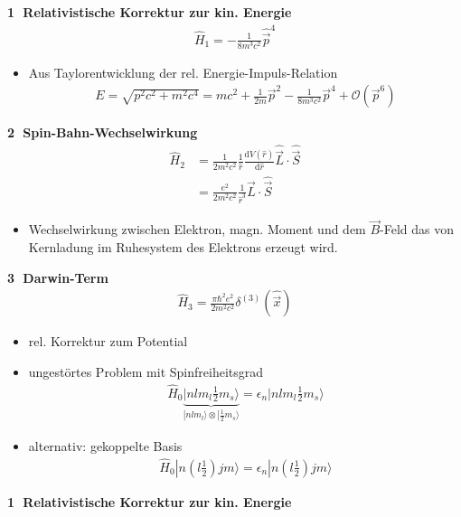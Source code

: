 \documentclass[10pt,article,colorback,accentcolor=tud9d]{scrartcl}
\begin{document}
\noindent\textbf{\textcircled{1} Relativistische Korrektur zur kin. Energie}
\begin{align}
\hat{H}_1=-\frac{1}{8m^3c^2}\hat{\vec{p}}^4
\end{align}
\begin{itemize}
	\item Aus Taylorentwicklung der rel. Energie-Impuls-Relation
    \begin{align}
    E=\sqrt{p^2c^2+m^2c^4}=mc^2+\frac{1}{2m}\vec{p}^2-\frac{1}{8m^3c^2}\vec{p}^4+\mathcal{O}(\vec{p}^6)
    \end{align}
\end{itemize}
\noindent\textbf{\textcircled{2} Spin-Bahn-Wechselwirkung}
\begin{align}
\hat{H}_2&=\frac{1}{2m^2c^2}\frac{1}{\hat{r}}\frac{\text{d}V(\hat{r})}{\text{d}\hat{r}}\hat{\vec{L}}\cdot\hat{\vec{S}}\\
&=\frac{e^2}{2m^2c^2}\frac{1}{\hat{r}^3}\hat{\vec{L}}\cdot\hat{\vec{S}}
\end{align}
\begin{itemize}
	\item Wechselwirkung zwischen Elektron, magn. Moment und dem $\vec{B}$-Feld das von Kernladung im Ruhesystem des Elektrons erzeugt wird.
\end{itemize}
\noindent\textbf{\textcircled{3} Darwin-Term}
\begin{align}
\hat{H}_3=\frac{\pi\hbar^2e^2}{2m^2c^2}\delta^{(3)}(\hat{\vec{x}})
\end{align}
\begin{itemize}
	\item rel. Korrektur zum Potential
  \item ungestörtes Problem mit Spinfreiheitsgrad
    \begin{align}
    \hat{H}_0\underbrace{|nlm_l\frac{1}{2}m_s\rangle}_{|nlm_l\rangle\otimes|\frac{1}{2}m_s\rangle}=\epsilon_n|nlm_l\frac{1}{2}m_s\rangle
    \end{align}
  \item alternativ: gekoppelte Basis
    \begin{align}
    \hat{H}_0|n\left(l\frac{1}{2}\right)jm\rangle=\epsilon_n|n\left(l\frac{1}{2}\right)jm\rangle
    \end{align}
\end{itemize}
\noindent\textbf{\textcircled{1} Relativistische Korrektur zur kin. Energie}
\end{document}
